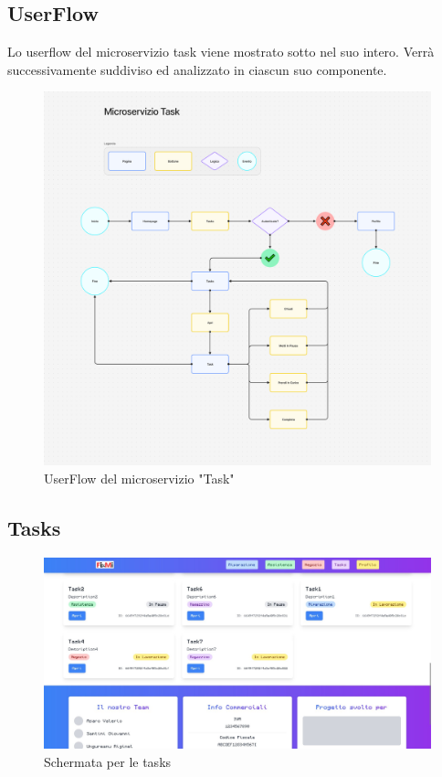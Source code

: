 \documentclass{report}
\begin{document}
\subsection{UserFlow}
Lo userflow del microservizio task viene mostrato sotto nel suo intero. Verrà successivamente suddiviso ed analizzato in ciascun suo componente.
\begin{figure}[H]
	\centering\includegraphics[width=1\textwidth]{images/microservizio-task/userflow-task.png}
	\caption{UserFlow del microservizio "Task"}
\end{figure}


\subsection{Tasks}

\begin{figure}[H]
	\centering\includegraphics[width=1\textwidth]{images/microservizio-task/frontend/tasks.jpg}
	\caption{Schermata per le tasks}
\end{figure}
\end{document}
